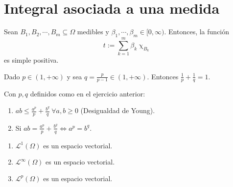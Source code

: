   

\newpage



\section{Integral asociada a una medida}

\begin{ejer} Sean $B_1,B_2,\cdots,B_m \subseteq \Omega$ medibles y $\beta_1,\cdots,\beta_m\in[0,\infty)$. Entonces, la función $$t:= \sum_{k=1}^m \beta_k \upchi_{B_k}$$  es simple positiva.

\end{ejer}


\begin{ejer}
  Dado $p \in (1, +\infty)$ y sea $q = \frac{p}{p-1} \in (1, +\infty)$. Entonces $\frac{1}{p} + \frac{1}{q} = 1$.
\end{ejer}

\begin{ejer}
  Con $p, q$ definidos como en el ejercicio anterior:
  \begin{enumerate}
  \item $ \displaystyle ab \leq \frac{a^p}{p} + \frac{b^q}{q} \ \forall a, b \geq 0$ (Desigualdad de Young).
  \item Si $ \displaystyle ab = \frac{a^p}{p} + \frac{b^q}{q} \Leftrightarrow a^p = b^q$.
  \end{enumerate}
\end{ejer}

\begin{ejer}
  \begin{enumerate}
  \item $\mathcal L^{1} (\Omega)$ es un espacio vectorial.
  \item $\mathcal L^{\infty} (\Omega)$ es un espacio vectorial.
  \item $\mathcal L^{p} (\Omega)$ es un espacio vectorial.
  \end{enumerate}


\end{ejer}

